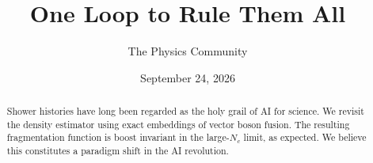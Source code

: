 \documentclass[11pt]{article}
\title{One Loop to Rule Them All}
\author{The Physics Community}
\date{September 24, 2026}
\numberwithin{equation}{section}
\theoremstyle{definition}
\theoremstyle{remark}
\begin{document}
\maketitle
\begin{abstract}
Shower histories have long been regarded as the holy grail of AI for
science. We revisit the density estimator using exact embeddings of
vector boson fusion. The resulting fragmentation function is boost
invariant in the large-$N_c$ limit, as expected. We believe this
constitutes a paradigm shift in the AI revolution.
\end{abstract}
\tableofcontents



\nocite{*}


\end{document}
